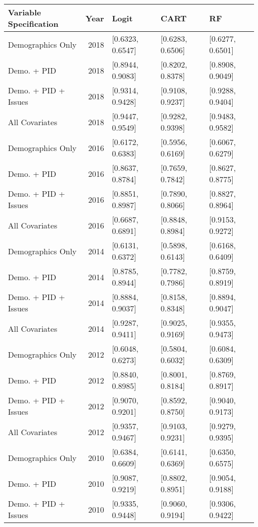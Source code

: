 \begin{longtable}{lrlll}
  \toprule
Variable Specification & Year & Logit & CART & RF \\ 
  \midrule
Demographics Only & 2018 & [0.6323, 0.6547] & [0.6283, 0.6506] & [0.6277, 0.6501] \\ 
  Demo. + PID & 2018 & [0.8944, 0.9083] & [0.8202, 0.8378] & [0.8908, 0.9049] \\ 
  Demo. + PID + Issues & 2018 & [0.9314, 0.9428] & [0.9108, 0.9237] & [0.9288, 0.9404] \\ 
  All Covariates & 2018 & [0.9447, 0.9549] & [0.9282, 0.9398] & [0.9483, 0.9582] \\ 
  Demographics Only & 2016 & [0.6172, 0.6383] & [0.5956, 0.6169] & [0.6067, 0.6279] \\ 
  Demo. + PID & 2016 & [0.8637, 0.8784] & [0.7659, 0.7842] & [0.8627, 0.8775] \\ 
  Demo. + PID + Issues & 2016 & [0.8851, 0.8987] & [0.7890, 0.8066] & [0.8827, 0.8964] \\ 
  All Covariates & 2016 & [0.6687, 0.6891] & [0.8848, 0.8984] & [0.9153, 0.9272] \\ 
  Demographics Only & 2014 & [0.6131, 0.6372] & [0.5898, 0.6143] & [0.6168, 0.6409] \\ 
  Demo. + PID & 2014 & [0.8785, 0.8944] & [0.7782, 0.7986] & [0.8759, 0.8919] \\ 
  Demo. + PID + Issues & 2014 & [0.8884, 0.9037] & [0.8158, 0.8348] & [0.8894, 0.9047] \\ 
  All Covariates & 2014 & [0.9287, 0.9411] & [0.9025, 0.9169] & [0.9355, 0.9473] \\ 
  Demographics Only & 2012 & [0.6048, 0.6273] & [0.5804, 0.6032] & [0.6084, 0.6309] \\ 
  Demo. + PID & 2012 & [0.8840, 0.8985] & [0.8001, 0.8184] & [0.8769, 0.8917] \\ 
  Demo. + PID + Issues & 2012 & [0.9070, 0.9201] & [0.8592, 0.8750] & [0.9040, 0.9173] \\ 
  All Covariates & 2012 & [0.9357, 0.9467] & [0.9103, 0.9231] & [0.9279, 0.9395] \\ 
  Demographics Only & 2010 & [0.6384, 0.6609] & [0.6141, 0.6369] & [0.6350, 0.6575] \\ 
  Demo. + PID & 2010 & [0.9087, 0.9219] & [0.8802, 0.8951] & [0.9054, 0.9188] \\ 
  Demo. + PID + Issues & 2010 & [0.9335, 0.9448] & [0.9060, 0.9194] & [0.9306, 0.9422] \\ 

\end{longtable}
